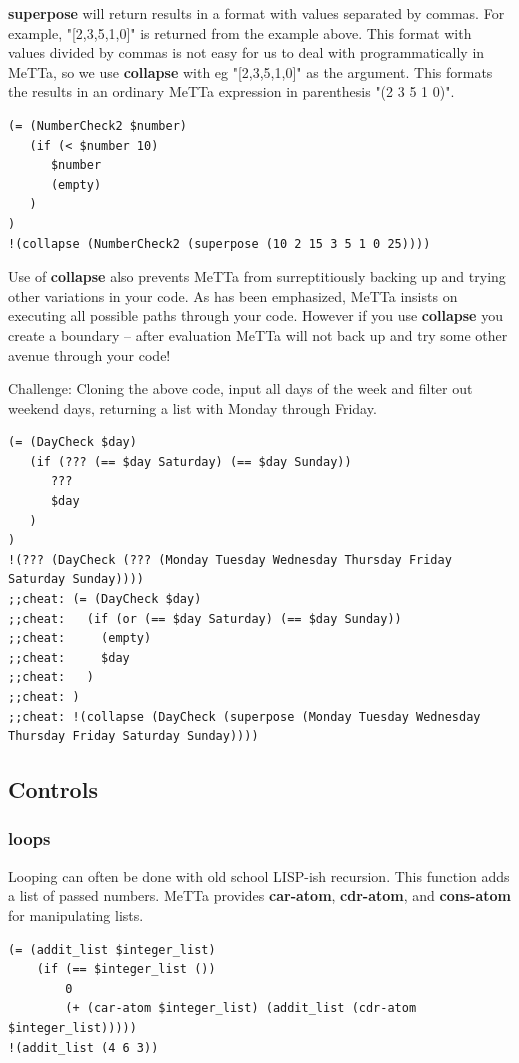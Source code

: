 \documentclass{article}
\begin{document}
\textbf{superpose} will return results in a format with values separated by commas. For example, "[2,3,5,1,0]" is returned from the example above. This format with values divided by commas is not easy for us to deal with programmatically in MeTTa, so we use \textbf{collapse} with eg "[2,3,5,1,0]" as the argument. This formats the results in an ordinary MeTTa expression in parenthesis "(2 3 5 1 0)". 

\begin{verbatim}
(= (NumberCheck2 $number)
   (if (< $number 10)
      $number
      (empty)
   )
)
!(collapse (NumberCheck2 (superpose (10 2 15 3 5 1 0 25))))
\end{verbatim}

Use of  \textbf{collapse} also prevents MeTTa from surreptitiously backing up and trying other variations in your code. As has been emphasized, MeTTa insists on executing all possible paths through your code. However if you use \textbf{collapse} you create a boundary -- after evaluation MeTTa will not back up and try some other avenue through your code!


Challenge: Cloning the above code, input all days of the week and filter out weekend days, returning a list with Monday through Friday.

\begin{verbatim}
(= (DayCheck $day)
   (if (??? (== $day Saturday) (== $day Sunday))
      ???
      $day
   )
)
!(??? (DayCheck (??? (Monday Tuesday Wednesday Thursday Friday Saturday Sunday))))
;;cheat: (= (DayCheck $day)
;;cheat:   (if (or (== $day Saturday) (== $day Sunday))
;;cheat:     (empty)
;;cheat:     $day
;;cheat:   )
;;cheat: )
;;cheat: !(collapse (DayCheck (superpose (Monday Tuesday Wednesday Thursday Friday Saturday Sunday))))
\end{verbatim}

\subsection{Controls}

\subsubsection{loops}

Looping can often be done with old school LISP-ish recursion. This function adds a list of passed numbers. MeTTa provides \textbf{car-atom}, \textbf{cdr-atom}, and \textbf{cons-atom} for manipulating lists.

\begin{verbatim}
(= (addit_list $integer_list)
    (if (== $integer_list ())
        0
        (+ (car-atom $integer_list) (addit_list (cdr-atom $integer_list)))))
!(addit_list (4 6 3))
\end{verbatim}
\end{document}
